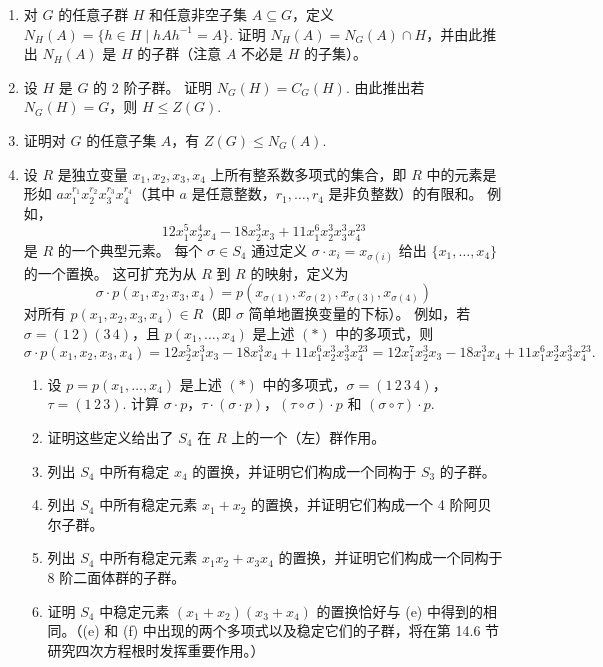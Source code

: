 \begin{enumerate}
\item 对 \( G \) 的任意子群 \( H \) 和任意非空子集 \( A \subseteq G \)，定义 \( N_H(A) = \{h \in H \mid hAh^{-1} = A\} \). 
证明 \( N_H(A) = N_G(A) \cap H \)，并由此推出 \( N_H(A) \) 是 \( H \) 的子群（注意 \( A \) 不必是 \( H \) 的子集）。

\item 设 \( H \) 是 \( G \) 的 2 阶子群。
证明 \( N_G(H) = C_G(H) \). 
由此推出若 \( N_G(H) = G \)，则 \( H \leq Z(G) \).

\item 证明对 \( G \) 的任意子集 \( A \)，有 \( Z(G) \leq N_G(A) \).

\item 设 \( R \) 是独立变量 \( x_1, x_2, x_3, x_4 \) 上所有整系数多项式的集合，即 \( R \) 中的元素是形如 \( a x_1^{r_1} x_2^{r_2} x_3^{r_3} x_4^{r_4} \)（其中 \( a \) 是任意整数，\( r_1, \ldots, r_4 \) 是非负整数）的有限和。
例如，
\[
12x_1^5 x_2^4 x_4 - 18x_2^3 x_3 + 11x_1^6 x_2^3 x_3^3 x_4^{23}
\]
是 \( R \) 的一个典型元素。
每个 \( \sigma \in S_4 \) 通过定义 \( \sigma \cdot x_i = x_{\sigma(i)} \) 给出 \( \{x_1, \ldots, x_4\} \) 的一个置换。
这可扩充为从 \( R \) 到 \( R \) 的映射，定义为
\[
\sigma \cdot p(x_1, x_2, x_3, x_4) = p(x_{\sigma(1)}, x_{\sigma(2)}, x_{\sigma(3)}, x_{\sigma(4)})
\]
对所有 \( p(x_1, x_2, x_3, x_4) \in R \)（即 \( \sigma \) 简单地置换变量的下标）。
例如，若 \( \sigma = (1 \, 2)(3 \, 4) \)，且 \( p(x_1, \ldots, x_4) \) 是上述 \( (*) \) 中的多项式，则
\[
\sigma \cdot p(x_1, x_2, x_3, x_4) = 12x_2^5 x_1^3 x_3 - 18x_1^3 x_4 + 11x_1^6 x_2^3 x_3^3 x_4^{23}
= 12x_1^7 x_2^3 x_3 - 18x_1^3 x_4 + 11x_1^6 x_2^3 x_3^3 x_4^{23}.
\]
\begin{enumerate}[label=(\alph*)]
\item 设 \( p = p(x_1, \ldots, x_4) \) 是上述 \( (*) \) 中的多项式，\( \sigma = (1 \, 2 \, 3 \, 4) \)，\( \tau = (1 \, 2 \, 3) \). 计算 \( \sigma \cdot p \)，\( \tau \cdot (\sigma \cdot p) \)，\( (\tau \circ \sigma) \cdot p \) 和 \( (\sigma \circ \tau) \cdot p \).
\item 证明这些定义给出了 \( S_4 \) 在 \( R \) 上的一个（左）群作用。
\item 列出 \( S_4 \) 中所有稳定 \( x_4 \) 的置换，并证明它们构成一个同构于 \( S_3 \) 的子群。
\item 列出 \( S_4 \) 中所有稳定元素 \( x_1 + x_2 \) 的置换，并证明它们构成一个 4 阶阿贝尔子群。
\item 列出 \( S_4 \) 中所有稳定元素 \( x_1 x_2 + x_3 x_4 \) 的置换，并证明它们构成一个同构于 8 阶二面体群的子群。
\item 证明 \( S_4 \) 中稳定元素 \( (x_1 + x_2)(x_3 + x_4) \) 的置换恰好与 (e) 中得到的相同。（(e) 和 (f) 中出现的两个多项式以及稳定它们的子群，将在第 14.6 节研究四次方程根时发挥重要作用。）
\end{enumerate}


\end{enumerate}
